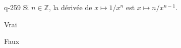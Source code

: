 \begin{truefalse}{q-259}
Si $n \in \mathbb Z$, la dérivée de $x\mapsto 1/x^n$ est $x\mapsto n/x^{n-1}$.
\item Vrai
\item* Faux
\end{truefalse}

